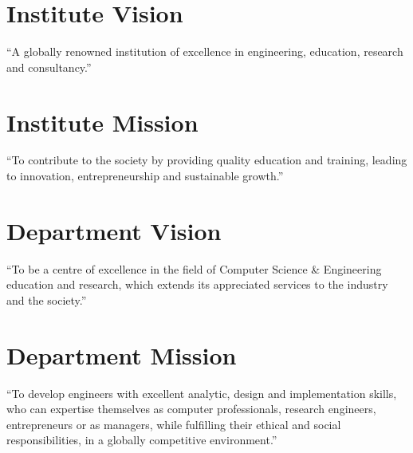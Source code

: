 \clearpage
\vspace{1.0in}
\begin{center} 
\section*{Institute Vision}
\begin{flushleft}
``A globally renowned institution of excellence in engineering, 
 education, research and consultancy.''
\end{flushleft}

\section*{Institute Mission}
\begin{flushleft}
``To contribute to the society by providing quality education and training, leading to innovation, 
entrepreneurship and sustainable growth.''
\end{flushleft}

\section*{Department Vision}
\begin{flushleft}
``To be a centre of excellence in the field of Computer Science \& Engineering education and 
research, which extends its appreciated services to the industry and the society.''
\end{flushleft}

\section*{Department Mission}
\begin{flushleft}
``To develop engineers with excellent analytic, design and implementation skills, who can 
expertise themselves as computer professionals, research engineers, entrepreneurs or as managers, 
while fulfilling their ethical and social responsibilities, in a globally competitive environment.''
\end{flushleft}
\end{center}
